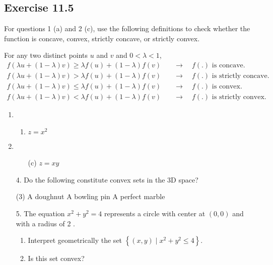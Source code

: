 \documentclass{./../../Latex/homework}
\begin{document}
\thispagestyle{plain}

\subsection*{Exercise 11.5}

For questions 1 (a) and 2 (c), use the following definitions to check whether the function is concave, convex, strictly concave, or strictly convex.

For any two distinct points $u$ and $v$ and $0<\lambda<1$,
\begin{align*}
	f(\lambda u + (1-\lambda) v) \geq \lambda f(u) + (1-\lambda) f(v) \quad & \rightarrow \quad f(.) \text{ is concave.} \\
	f(\lambda u + (1-\lambda) v) > \lambda f(u) + (1-\lambda) f(v) \quad & \rightarrow \quad f(.) \text{ is strictly concave.} \\
	f(\lambda u + (1-\lambda) v) \leq \lambda f(u) + (1-\lambda) f(v) \quad & \rightarrow \quad f(.) \text{ is convex.} \\
	f(\lambda u + (1-\lambda) v) < \lambda f(u) + (1-\lambda) f(v) \quad & \rightarrow \quad f(.) \text{ is strictly convex.} 
\end{align*}

\begin{enumerate}

\item \begin{enumerate} \item  $z=x^{2}$ 
\end{enumerate}


\item \begin{enumerate} \item[(c)]  $z=xy$ 
\end{enumerate}

\item[4.] Do the following constitute convex sets in the 3D space?
\begin{tasks}(3)
\task A doughnut
\task A bowling pin
\task A perfect marble
\end{tasks}

\item[5.] The equation $x^{2}+y^{2}=4$ represents a circle with center at $(0,0)$ and with a radius of 2 .
\begin{enumerate} 
\item Interpret geometrically the set $\left\{(x, y) \mid x^{2}+y^{2} \leq 4\right\}$.
\item Is this set convex?
\end{enumerate}

\end{enumerate}
\end{document}
